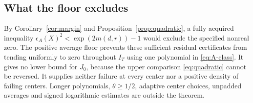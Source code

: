 \subsection{What the floor excludes}

By Corollary~\ref{cor:margin} and Proposition~\ref{prop:quadratic},
a fully acquired inequality
\(\epsilon_A(X)^2<\exp(2m(d,r))-1\) would exclude the specified
nonreal zero. The positive average floor prevents these sufficient
residual certificates from tending uniformly to zero throughout
\(I_T\) using one polynomial in \eqref{eq:A-class}.
It gives no lower bound for \(J_0\), because the upper comparison
\eqref{eq:quadratic} cannot be reversed. It supplies neither failure
at every center nor a positive density of failing centers.
Longer polynomials, \(\theta\ge1/2\), adaptive center choices,
unpadded averages and signed logarithmic estimates are outside
the theorem.


